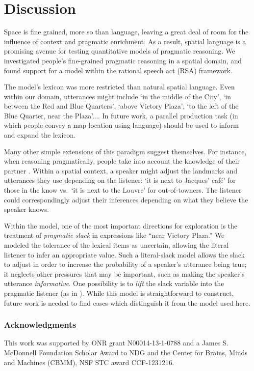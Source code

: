 \documentclass[10pt,letterpaper]{article}
\newcommand{\ndg}[1]{\textcolor{Green}{[ndg: #1]}}
\begin{document}
\section{Discussion}



Space is fine grained, more so than language, leaving a great deal of room for the influence of context and pragmatic enrichment. As a result, spatial language is a promising avenue for testing quantitative models of pragmatic reasoning. We investigated people's fine-grained pragmatic reasoning in a spatial domain, and found support for a model within the rational speech act (RSA) framework.  

The model's lexicon was more restricted than natural spatial language. Even within our domain, utterances might include `in the middle of the City', `in between the Red and Blue Quarters', `above Victory Plaza', `to the left of the Blue Quarter, near the Plaza'.... In future work, a parallel production task (in which people convey a map location using language) should be used to inform and expand the lexicon. 

Many other simple extensions of this paradigm suggest themselves. For instance, when reasoning pragmatically, people take into account the knowledge of their partner \cite{ndg+ast:topics2013}. Within a spatial context, a speaker might adjust the landmarks and utterances they use depending on the listener: `it is next to Jacques' caf\'{e}' for those in the know vs.~`it is next to the Louvre' for out-of-towners. The listener could correspondingly adjust their inferences depending on what they believe the speaker knows.

Within the model, one of the most important directions for exploration is the treatment of \emph{pragmatic slack} in expressions like ``near Victory Plaza.'' We modeled the tolerance of the lexical items as uncertain, allowing the literal listener to infer an appropriate value. Such a literal-slack model allows the slack to adjust in order to increase the probability of a speaker's utterance being true; it neglects other pressures that may be important, such as making the speaker's utterance \emph{informative}. 
One possibility is to \emph{lift} the slack variable into the pragmatic listener (as in ). While this model is straightforward to construct, future work is needed to find cases which distinguish it from the model used here.

\subsubsection{Acknowledgments}
\small
This work was supported by ONR grant N00014-13-1-0788 and a James S. McDonnell Foundation Scholar Award to NDG and the Center for Brains, Minds and Machines (CBMM), NSF STC award CCF-1231216. 


\setlength{\bibleftmargin}{.125in}
\setlength{\bibindent}{-\bibleftmargin}

\end{document}
